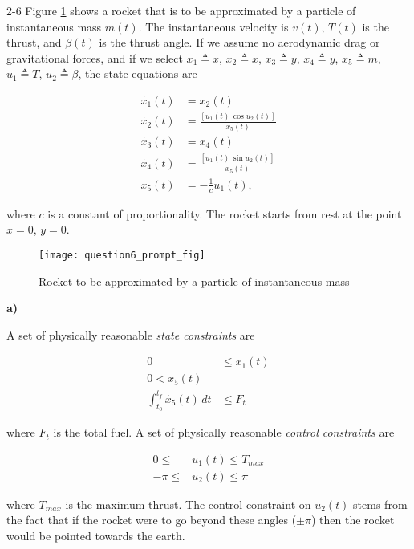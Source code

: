 \begin{problem}{2-6}
Figure \ref{fig:question6_prompt_fig} shows a rocket that is to be approximated
by a particle of instantaneous mass $m(t)$. The instantaneous velocity is $v(t)$,
$T(t)$ is the thrust, and $\beta(t)$ is the thrust angle. If we assume no 
aerodynamic drag or gravitational forces, and if we select $x_1 \triangleq x$,
$x_2 \triangleq \dot{x}$, $x_3 \triangleq y$, $x_4 \triangleq \dot{y}$, $x_5 \triangleq m$,
$u_1 \triangleq T$, $u_2 \triangleq \beta$, the state equations are

\begin{align}
  \dot{x_1}(t) &= x_2(t) \\
  \dot{x_2}(t) &= \frac{[u_1(t)\, \cos u_2(t)]}{x_5(t)} \\
  \dot{x_3}(t) &= x_4(t) \\
  \dot{x_4}(t) &= \frac{[u_1(t)\, \sin u_2(t)]}{x_5(t)} \\
  \dot{x_5}(t) &= -\frac{1}{c}u_1(t),
\end{align}

\noindent where $c$ is a constant of proportionality. The rocket starts from 
rest at the point $x = 0$, $y = 0$.
\end{problem}


\begin{figure}[H]
    \texttt{[image: question6\_prompt\_fig]}
    \centering
    \caption{Rocket to be approximated by a particle of instantaneous mass \cite{kirkdover}}
    \label{fig:question6_prompt_fig}
\end{figure}

\noindent \textbf{a)}

A set of physically reasonable \textit{state constraints} are

\begin{align}
  0 &\leq x_1(t) \\
  0 < x_5(t) \\
  \int_{t_0}^{t_f} \dot{x_5}(t) \, dt &\leq F_t
\end{align}

\noindent where $F_t$ is the total fuel. A set of physically reasonable 
\textit{control constraints} are

\begin{align}
     0 \leq & u_1(t) \leq T_{max} \\
  -\pi \leq & u_2(t) \leq \pi
\end{align}

\noindent where $T_{max}$ is the maximum thrust. The control constraint on $u_2(t)$
stems from the fact that if the rocket were to go beyond these angles ($\pm \pi$)
then the rocket would be pointed towards the earth.

